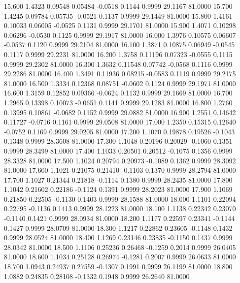   15.600   1.4323   0.09548   0.05484  -0.0518   0.1144   0.9999  29.1167  81.0000
  15.700   1.4245   0.09784   0.05735  -0.0521   0.1137   0.9999  29.1449  81.0000
  15.800   1.4161   0.10033   0.06005  -0.0525   0.1131   0.9999  29.1701  81.0000
  15.900   1.4071   0.10298   0.06296  -0.0530   0.1125   0.9999  29.1917  81.0000
  16.000   1.3976   0.10575   0.06607  -0.0537   0.1120   0.9999  29.2104  81.0000
  16.100   1.3871   0.10875   0.06949  -0.0545   0.1117   0.9999  29.2231  81.0000
  16.200   1.3758   0.11196   0.07323  -0.0555   0.1115   0.9999  29.2302  81.0000
  16.300   1.3632   0.11548   0.07742  -0.0568   0.1116   0.9999  29.2286  81.0000
  16.400   1.3491   0.11936   0.08215  -0.0583   0.1119   0.9999  29.2175  81.0000
  16.500   1.3334   0.12368   0.08751  -0.0602   0.1124   0.9999  29.1971  81.0000
  16.600   1.3159   0.12852   0.09366  -0.0624   0.1132   0.9999  29.1669  81.0000
  16.700   1.2965   0.13398   0.10073  -0.0651   0.1141   0.9999  29.1283  81.0000
  16.800   1.2760   0.13995   0.10861  -0.0682   0.1152   0.9999  29.0882  81.0000
  16.900   1.2551   0.14642   0.11727  -0.0716   0.1161   0.9999  29.0508  81.0000
  17.000   1.2350   0.15315   0.12640  -0.0752   0.1169   0.9999  29.0205  81.0000
  17.200   1.1070   0.19878   0.19526  -0.1043   0.1348   0.9999  28.3608  81.0000
  17.300   1.1048   0.20196   0.20029  -0.1060   0.1351   0.9999  28.3499  81.0000
  17.400   1.1033   0.20501   0.20512  -0.1075   0.1356   0.9999  28.3328  81.0000
  17.500   1.1024   0.20794   0.20973  -0.1089   0.1362   0.9999  28.3092  81.0000
  17.600   1.1021   0.21075   0.21410  -0.1103   0.1370   0.9999  28.2794  81.0000
  17.700   1.1027   0.21344   0.21818  -0.1114   0.1380   0.9999  28.2435  81.0000
  17.800   1.1042   0.21602   0.22186  -0.1124   0.1391   0.9999  28.2023  81.0000
  17.900   1.1069   0.21850   0.22505  -0.1130   0.1403   0.9999  28.1588  81.0000
  18.000   1.1101   0.22094   0.22795  -0.1136   0.1413   0.9999  28.1223  81.0000
  18.100   1.1138   0.22342   0.23070  -0.1140   0.1421   0.9999  28.0934  81.0000
  18.200   1.1177   0.22597   0.23341  -0.1144   0.1427   0.9999  28.0709  81.0000
  18.300   1.1217   0.22862   0.23605  -0.1148   0.1432   0.9999  28.0524  81.0000
  18.400   1.1269   0.23146   0.23835  -0.1150   0.1437   0.9999  28.0342  81.0000
  18.500   1.1106   0.25236   0.26468  -0.1259   0.2014   0.9999  26.0405  81.0000
  18.600   1.1034   0.25128   0.26974  -0.1281   0.2007   0.9999  26.0633  81.0000
  18.700   1.0943   0.24937   0.27559  -0.1307   0.1991   0.9999  26.1199  81.0000
  18.800   1.0882   0.24835   0.28108  -0.1332   0.1948   0.9999  26.2640  81.0000
